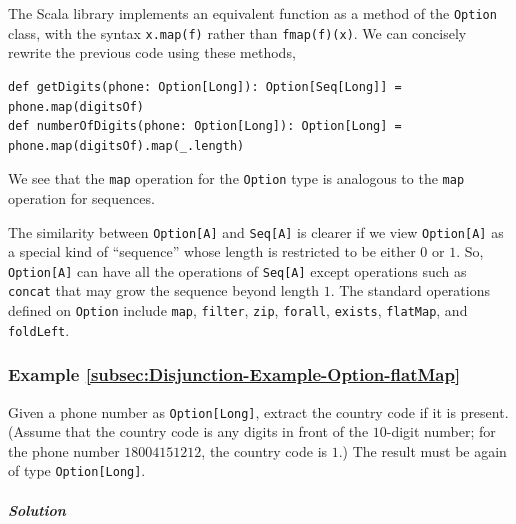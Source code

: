 The Scala library implements an equivalent function as a method of
the \lstinline!Option! class, with the syntax \lstinline!x.map(f)!
rather than \lstinline!fmap(f)(x)!. We can concisely rewrite the
previous code using these methods,
\begin{lstlisting}
def getDigits(phone: Option[Long]): Option[Seq[Long]] = phone.map(digitsOf)
def numberOfDigits(phone: Option[Long]): Option[Long] = phone.map(digitsOf).map(_.length)
\end{lstlisting}
We see that the \lstinline!map! operation for the \lstinline!Option!
type is analogous to the \lstinline!map! operation for sequences. 

The similarity between \lstinline!Option[A]! and \lstinline!Seq[A]!
is clearer if we view \lstinline!Option[A]! as a special kind of
\textsf{``}sequence\textsf{''} whose length is restricted to be either $0$ or $1$.
So, \lstinline!Option[A]! can have all the operations of \lstinline!Seq[A]!
except operations such as \lstinline!concat! that may grow the sequence
beyond length $1$. The standard operations defined on \lstinline!Option!
include \lstinline!map!, \lstinline!filter!, \lstinline!zip!, \lstinline!forall!,
\lstinline!exists!, \lstinline!flatMap!, and \lstinline!foldLeft!.

\subsubsection{Example \label{subsec:Disjunction-Example-Option-flatMap}\ref{subsec:Disjunction-Example-Option-flatMap}}

Given a phone number as \lstinline!Option[Long]!, extract the country
code if it is present. (Assume that the country code is any digits
in front of the $10$-digit number; for the phone number $18004151212$,
the country code is $1$.) The result must be again of type \lstinline!Option[Long]!.

\subparagraph{Solution}

